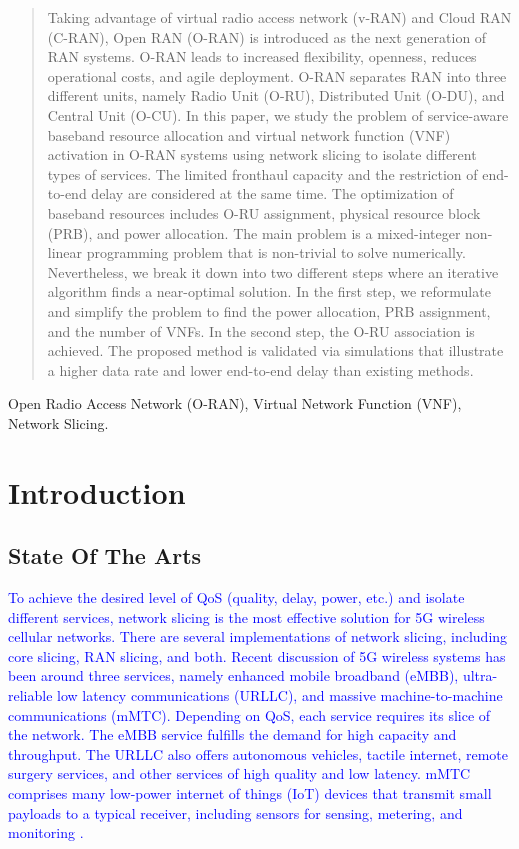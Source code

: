 \documentclass[lettersize,journal]{IEEEtran}
\begin{document}
\begin{abstract}
Taking advantage of virtual radio access network (v-RAN) and Cloud RAN (C-RAN), Open RAN (O-RAN) is introduced as the next generation of RAN systems. O-RAN leads to increased flexibility, openness, reduces operational costs, and agile deployment. O-RAN separates RAN into three different units, namely Radio Unit (O-RU), Distributed Unit (O-DU), and Central Unit (O-CU).
In this paper, we study the problem of service-aware baseband resource allocation and virtual network function (VNF) activation in O-RAN systems using network slicing to isolate different types of services.
The limited fronthaul capacity and the restriction of end-to-end delay are considered at the same time.
The optimization of baseband resources includes O-RU assignment, physical resource block (PRB), and power allocation. The main problem is a mixed-integer non-linear programming problem that is non-trivial to solve numerically.
Nevertheless, we break it down into two different steps where an iterative algorithm finds a near-optimal solution.
In the first step, we reformulate and simplify the problem to find the power allocation, PRB assignment, and the number of VNFs. In the second step, the O-RU association is achieved.
The proposed method is validated via simulations that illustrate a higher data rate and lower end-to-end delay than existing methods. 
\end{abstract}
\begin{IEEEkeywords}
Open Radio Access Network (O-RAN), Virtual Network Function (VNF), Network Slicing.
\end{IEEEkeywords}
\section{Introduction} 
\subsection{State Of The Arts}
\textcolor{blue}{To achieve the desired level of QoS (quality, delay, power, etc.) and isolate different services, network slicing is the most effective solution for 5G wireless cellular networks. There are several implementations of network slicing, including core slicing, RAN slicing, and both. 
Recent discussion of 5G wireless systems has been around three services, namely enhanced mobile broadband (eMBB), ultra-reliable low latency communications (URLLC), and massive machine-to-machine communications (mMTC). Depending on QoS, each service requires its slice of the network.
The eMBB service fulfills the demand for high capacity and throughput. The URLLC also offers autonomous vehicles, tactile internet, remote surgery services, and other services of high quality and low latency. mMTC comprises many low-power internet of things (IoT) devices that transmit small payloads to a typical receiver, including sensors for sensing, metering, and monitoring
\cite{shen2020ai,setayesh2020joint,popovski20185g,dogra2020survey,kassab2018coexistence,alsenwi2021intelligent}.
}
\end{document}
